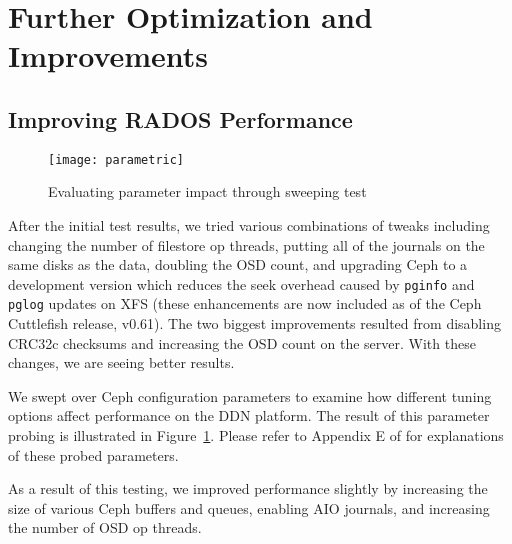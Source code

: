 \section{Further Optimization and Improvements}
\label{sec:ceph-tuning}

\subsection{Improving RADOS Performance}

\begin{figure}[h]
\centering
\texttt{[image: parametric]}
\caption{Evaluating parameter impact through sweeping test}
\label{fig:parametric}
\end{figure}


After the initial test results, we tried various combinations of tweaks
including changing the number of filestore op threads, putting all of the
journals on the same disks as the data, doubling the OSD count, and upgrading
Ceph to a development version which reduces the seek overhead caused by
\texttt{pginfo} and \texttt{pglog} updates on XFS (these enhancements are now
included as of the Ceph Cuttlefish release, v0.61).  The two biggest
improvements resulted from disabling CRC32c checksums and increasing the OSD
count on the server.  With these changes, we are seeing better results.

We swept over Ceph configuration parameters to examine how different tuning
options affect performance on the DDN platform. The result of this parameter
probing is illustrated in Figure~\ref{fig:parametric}. Please refer to
Appendix E of \cite{ceph:techreport} for explanations of these probed
parameters.


As a result of this testing, we improved performance slightly by
increasing the size of various Ceph buffers and queues, enabling AIO journals,
and increasing the number of OSD op threads.


